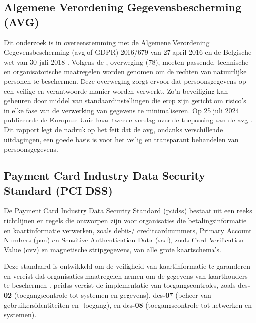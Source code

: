 \subsection{Algemene Verordening Gegevens\-besch\-erming (AVG)}%

Dit onderzoek is in overeenstemming met de Algemene Verordening Gegevensbescherming (\gls{avg} of GDPR) 2016/679 van 27 april 2016 \autocite{eu_avg2016} en de Belgische wet van 30 juli 2018 \autocite{BelgischeOverheid2018}.
Volgens de \textcite{eu_avg2016}, overweging (78), moeten passende, technische en organisatorische maatregelen worden genomen om de rechten van natuurlijke personen te beschermen. 
Deze overweging zorgt ervoor dat persoonsgegevens op een veilige en verantwoorde manier worden verwerkt. 
Zo'n beveiliging kan gebeuren door middel van standaardinstellingen die erop zijn gericht om risico's in elke fase van de verwerking van gegevens te minimaliseren.
Op 25 juli 2024 publiceerde de Europese Unie haar tweede verslag over de toepassing van de \gls{avg} \autocite{eu_avg2024}. 
Dit rapport legt de nadruk op het feit dat de \gls{avg}, ondanks verschillende uitdagingen, een goede basis is voor het veilig en transparant behandelen van persoonsgegevens. 


\subsection{Payment Card Industry Data Security Standard (PCI DSS)}%
\label{sec:pcidss-literatuurstudie}

De Payment Card Industry Data Security Stand\-ard (\gls{pcidss}) bestaat uit een reeks richtlijnen en regels die ontworpen zijn voor organisaties die betalingsinformatie en kaartinformatie verwerken, 
zoals debit-/ creditcardnummers, Primary Account Numbers (\gls{pan}) en Sensitive Authentication Data (\gls{sad}), zoals Card Verification Value (\gls{cvv}) en magnetische stripgegevens, van alle grote kaartsche\-ma's. 

Deze standaard is ontwikkeld om de veiligheid van kaartinformatie te garanderen en vereist dat organisaties maatregelen nemen om de gegevens van kaarthouders te beschermen \autocite{Elluri2018}. 
\gls{pcidss} vereist de implementatie van toegangscontroles, zoals \gls{dcs}\textbf{-02} (toegangscontrole tot systemen en gegevens), \gls{dcs}\textbf{-07} (beheer van gebruikersidentiteiten en -toegang), 
en \gls{dcs}\textbf{-08} (toegangscontrole tot netwerken en systemen).%

